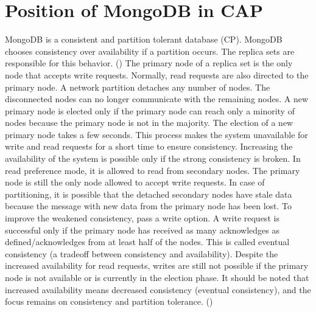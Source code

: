 \section*{Position of MongoDB in CAP}
MongoDB is a consistent and partition tolerant database (\ac{CP}). MongoDB chooses consistency over availability if a partition occurs. The replica sets are responsible for this behavior. (\cite{stackoverflow:2023})
The primary node of a replica set is the only node that accepts write requests. Normally, read requests are also directed to the primary node. A network partition detaches any number of nodes. The disconnected nodes can no longer communicate with the remaining nodes. A new primary node is elected only if the primary node can reach only a minority of nodes because the primary node is not in the majority. The election of a new primary node takes a few seconds. This process makes the system unavailable for write and read requests for a short time to ensure consistency.\newline
Increasing the availability of the system is possible only if the strong consistency is broken. In read preference mode, it is allowed to read from secondary nodes. The primary node is still the only node allowed to accept write requests. In case of partitioning, it is possible that the detached secondary nodes have stale data because the message with new data from the primary node has been lost.\newline
To improve the weakened consistency, pass a write option. A write request is successful only if the primary node has received as many acknowledges as defined/acknowledges from at least half of the nodes. This is called eventual consistency (a tradeoff between consistency and availability). Despite the increased availability for read requests, writes are still not possible if the primary node is not available or is currently in the election phase. It should be noted that increased availability means decreased consistency (eventual consistency), and the focus remains on consistency and partition tolerance. 
(\cite{katwal:2020})
